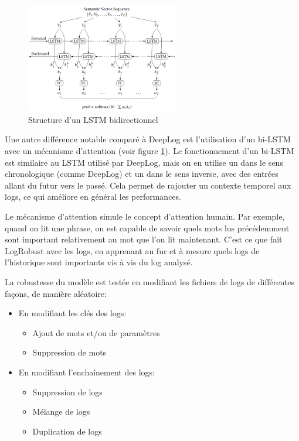 \documentclass[openany, 11pt]{memoir}
\begin{document}
\begin{figure}[ht]
	\centering
	\includegraphics[width=0.6\textwidth]{images/bilstm.png}
	\caption{Structure d'un LSTM bidirectionnel}
	\label{bilstm}
\end{figure}

\bigskip
Une autre différence notable comparé à DeepLog est l'utilisation d'un bi-\gls{LSTM} avec un mécanisme d'attention (voir figure \ref{bilstm}). Le fonctionnement d'un bi-LSTM est similaire au LSTM utilisé par DeepLog, mais on en utilise un dans le sens chronologique (comme DeepLog) et un dans le sens inverse, avec des entrées allant du futur vers le passé. Cela permet de rajouter un contexte temporel aux \glspl{log}, ce qui améliore en général les performances.

Le mécanisme d'attention simule le concept d'attention humain. Par exemple, quand on lit une phrase, on est capable de savoir quels mots lus précédemment sont important relativement au mot que l'on lit maintenant. C'est ce que fait LogRobust avec les \glspl{log}, en apprenant au fur et à mesure quels logs de l'historique sont importants vis à vis du log analysé.

\bigskip
La robustesse du modèle est testée en modifiant les fichiers de \glspl{log} de différentes façons, de manière aléatoire:

\begin{itemize}
	\item En modifiant les clés des logs:
	\begin{itemize}
		\item Ajout de mots et/ou de paramètres
		\item Suppression de mots
	\end{itemize}
	\item En modifiant l'enchaînement des logs:
	\begin{itemize}
		\item Suppression de logs
		\item Mélange de logs
		\item Duplication de logs
	\end{itemize}
\end{itemize}
\end{document}
